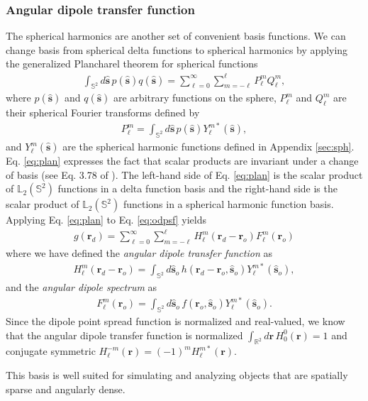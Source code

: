 \documentclass[]{osa-article}
\providecommand{\mb}[1]{\mathbf{#1}}
\providecommand{\ro}{\mathbf{\mathbf{r}}_o}
\providecommand{\so}{\mathbf{\hat{s}}_o}
\providecommand{\rd}{\mathbf{r}_d}
\providecommand{\mh}[1]{\mathbf{\hat{#1}}}
\providecommand{\mbb}[1]{\mathbb{#1}}
\providecommand{\lmsum}{\sum_{\ell=0}^\infty\sum_{m=-\ell}^{\ell}}
\providecommand{\ints}[1]{\int_{\mbb{S}^{#1}}}
\begin{document}
\subsubsection{Angular dipole transfer function}
The spherical harmonics are another set of convenient basis functions. We can
change basis from spherical delta functions to spherical harmonics by applying
the generalized Plancharel theorem for spherical functions
\begin{align}
  \ints{2}d\mh{s}\, p(\mh{s})q(\mh{s}) = \lmsum P_\ell^m Q_\ell^m, \label{eq:plan}
\end{align}
where $p(\mh{s})$ and $q(\mh{s})$ are arbitrary functions on the sphere, $P_\ell^m$ and $Q_\ell^m$ are their spherical Fourier transforms defined by
\begin{align}
  P_\ell^m = \int_{\mbb{S}^2}d\mh{s}\, p(\mh{s})Y_\ell^{m*}(\mh{s}),
\end{align}
and $Y_{\ell}^m(\mh{s})$ are the spherical harmonic functions defined in
Appendix \ref{sec:sph}. Eq. \ref{eq:plan} expresses the fact that scalar
products are invariant under a change of basis (see Eq. 3.78 of
\cite{barrett2004}). The left-hand side of Eq. \ref{eq:plan} is the scalar
product of $\mbb{L}_2(\mbb{S}^2)$ functions in a delta function basis and the
right-hand side is the scalar product of $\mbb{L}_2(\mbb{S}^2)$ functions in a
spherical harmonic function basis. Applying Eq. \ref{eq:plan} to Eq.
\ref{eq:odpsf} yields
\begin{align}
  g(\rd) = \lmsum H_\ell^m(\rd - \ro)F_\ell^m(\ro) \label{eq:atf-form}
\end{align}
where we have defined the \textit{angular dipole transfer function} as
\begin{align}
  H_\ell^m(\rd - \ro) = \int_{\mbb{S}^2}d\so\, h(\rd - \ro, \so)Y_{\ell}^{m*}(\so),\label{eq:atf-prep} 
\end{align}
and the \textit{angular dipole spectrum} as
\begin{align}
  F_\ell^m(\ro) = \int_{\mbb{S}^2}d\so\, f(\ro, \so)Y_{\ell}^{m*}(\so).
\end{align}
Since the dipole point spread function is normalized and real-valued, we know
that the angular dipole transfer function is normalized
$\int_{\mbb{R}^2}d\mb{r}\, H_0^0(\mb{r}) = 1$ and conjugate symmetric
$H_\ell^{-m}(\mb{r}) = (-1)^mH_\ell^{m*}(\mb{r})$.

This basis is well suited for simulating and analyzing objects that are
spatially sparse and angularly dense.
\end{document}
